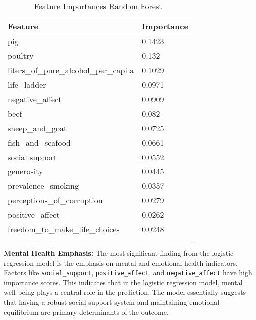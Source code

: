 		\begin{table}[h!]
			\centering
			\caption{Feature Importances Random Forest}
			\begin{tabularx}{0.8\textwidth}{lX}
				\toprule
				\textbf{Feature}                   & \textbf{Importance} \\
				\midrule
				pig                                    & 0.1423              \\
				poultry                                & 0.132               \\
				liters\_of\_pure\_alcohol\_per\_capita & 0.1029              \\
				life\_ladder                           & 0.0971              \\
				negative\_affect                       & 0.0909              \\
				beef                                   & 0.082               \\
				sheep\_and\_goat                       & 0.0725              \\
				fish\_and\_seafood                     & 0.0661              \\
				social support                         & 0.0552              \\
				generosity                             & 0.0445              \\
				prevalence\_smoking                    & 0.0357              \\
				perceptions\_of\_corruption            & 0.0279              \\
				positive\_affect                       & 0.0262              \\
				freedom\_to\_make\_life\_choices       & 0.0248              \\
				\bottomrule
				\label{table:fi_random}
			\end{tabularx}
		\end{table}

		\textbf{Mental Health Emphasis:} The most significant finding from the logistic regression model is the
		emphasis on mental and emotional health indicators. Factors like \texttt{social\_support},
		\texttt{positive\_affect}, and \texttt{negative\_affect} have high importance scores. This indicates that in
		the logistic regression model, mental well-being plays a central role in the prediction. The model essentially
		suggests that having a robust social support system and maintaining emotional equilibrium are primary
		determinants of the outcome.

